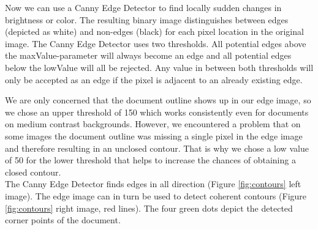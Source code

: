 \documentclass[bibliography=totoc]{scrartcl}
\begin{document}
Now we can use a Canny Edge Detector to find locally sudden changes in brightness or color.
The resulting binary image distinguishes between edges (depicted as white) and non-edges (black) for each pixel location in the original image.
The Canny Edge Detector uses two thresholds.
All potential edges above the maxValue-parameter will always become an edge and all potential edges below the lowValue will all be rejected.
Any value in between both thresholds will only be accepted as an edge if the pixel is adjacent to an already existing edge. \cite{Canny}

We are only concerned that the document outline shows up in our edge image, so we chose an upper threshold of 150 which works consistently even for documents on medium contrast backgrounds.
However, we encountered a problem that on some images the document outline was missing a single pixel in the edge image and therefore resulting in an unclosed contour.
That is why we chose a low value of 50 for the lower threshold that helps to increase the chances of obtaining a closed contour.\\
The Canny Edge Detector finds edges in all direction (Figure \ref{fig:contours} left image). The edge image can in turn be used to detect coherent contours (Figure \ref{fig:contours} right image, red lines). The four green dots depict the detected corner points of the document.
\end{document}
